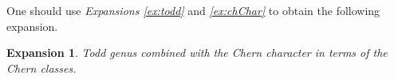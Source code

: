 \documentclass{amsart}
\theoremstyle{plain}
\numberwithin{equation}{section}
\newtheorem{ex}{Expansion}
\newtheorem{f}{Function}
\begin{document}
%


One should use \textit{Expansions \ref{ex:todd}} and \textit{\ref{ex:chChar}} to obtain the following expansion.

\begin{ex}
Todd genus combined with the Chern character in terms of the Chern classes.
\end{ex} 

%
\end{document}
